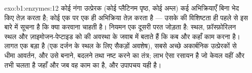 \begin{solution}{exo:b1:enzymes:12}
कोई नंगा उत्प्रेरक (कोई प्लैटिनम पृष्ठ, कोई अम्ल) कई अभिक्रियाएँ
बिना भेद किए तेज़ करता है; कोई  एक  पर एक ही अभिक्रिया
तेज़ करता है --- उसके  की विशिष्टता ही पहले से इस बारे में
सूचना है कि  क्या करवाना चाहती है। नियमन एक दूसरी परत जोड़ता है:
 स्थल, फ़ॉस्फ़ोरिलन स्थल और ज़ाइमोजन-पेप्टाइड  को
 की अवस्था के जवाब में बताते हैं कि कब और कहाँ काम करना है। लागत एक
बड़ा  है (एक दर्जन के स्थल के लिए सैकड़ों अवशेष), सबसे अच्छे
अकार्बनिक उत्प्रेरकों से धीमा आवर्तन, और उसे बनाने, बदलने तथा नष्ट करने
का तंत्र; लाभ ऐसा रसायन है जो केवल वहीं और तभी चलता है जहाँ और जब वह काम
का है, और उपापचय यही है।
\end{solution}


